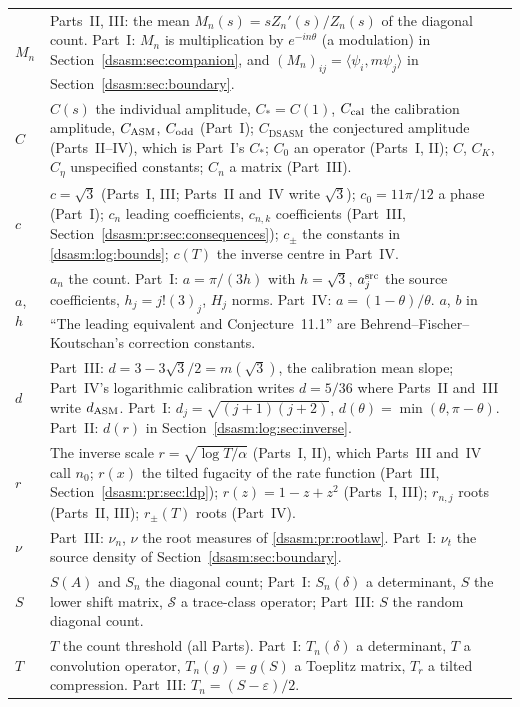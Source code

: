 \documentclass[11pt,letterpaper]{article}
\theoremstyle{remark}\newtheorem{remark}[theorem]{Remark}
\newcommand{\eps}{\varepsilon}\newcommand{\HH}{\mathcal H}\newcommand{\one}{\mathbf1}
\newcommand{\DS}{\mathrm{DSASM}}\newcommand{\ASM}{\mathrm{ASM}}
\begin{document}
\begin{longtable}{@{}>{\raggedright\arraybackslash}p{} >{\raggedright\arraybackslash}p{}@{}}
$M_n$ & Parts~II, III: the mean $M_n(s)=sZ_n'(s)/Z_n(s)$ of the diagonal count. Part~I: $M_n$ is multiplication by $e^{-in\theta}$ (a modulation) in Section~\ref{dsasm:sec:companion}, and $(M_n)_{ij}=\langle\psi_i,m\psi_j\rangle$ in Section~\ref{dsasm:sec:boundary}.\\
$C$ & $C(s)$ the individual amplitude, $C_*=C(1)$, $C_{\rm cal}$ the calibration amplitude, $C_{\rm ASM}$, $C_{\rm odd}$ (Part~I); $C_{\DS}$ the conjectured amplitude (Parts~II--IV), which is Part~I's $C_*$; $C_0$ an operator (Parts~I, II); $C$, $C_K$, $C_\eta$ unspecified constants; $C_n$ a matrix (Part~III).\\
$c$ & $c=\sqrt3$ (Parts~I, III; Parts~II and~IV write $\sqrt3$); $c_0=11\pi/12$ a phase (Part~I); $c_n$ leading coefficients, $c_{n,k}$ coefficients (Part~III, Section~\ref{dsasm:pr:sec:consequences}); $c_\pm$ the constants in \eqref{dsasm:log:bounds}; $c(T)$ the inverse centre in Part~IV.\\
$a$, $h$ & $a_n$ the count. Part~I: $a=\pi/(3h)$ with $h=\sqrt3$, $a_j^{\rm src}$ the source coefficients, $h_j=j!(3)_j$, $H_j$ norms. Part~IV: $a=(1-\theta)/\theta$. $a$, $b$ in ``The leading equivalent and Conjecture~11.1'' are Behrend--Fischer--Koutschan's correction constants.\\
$d$ & Part~III: $d=3-3\sqrt3/2=m(\sqrt3)$, the calibration mean slope; Part~IV's logarithmic calibration writes $d=5/36$ where Parts~II and~III write $d_{\rm ASM}$. Part~I: $d_j=\sqrt{(j+1)(j+2)}$, $d(\theta)=\min(\theta,\pi-\theta)$. Part~II: $d(r)$ in Section~\ref{dsasm:log:sec:inverse}.\\
$r$ & The inverse scale $r=\sqrt{\log T/\alpha}$ (Parts~I, II), which Parts~III and~IV call $n_0$; $r(x)$ the tilted fugacity of the rate function (Part~III, Section~\ref{dsasm:pr:sec:ldp}); $r(z)=1-z+z^2$ (Parts~I, III); $r_{n,j}$ roots (Parts~II, III); $r_\pm(T)$ roots (Part~IV).\\
$\nu$ & Part~III: $\nu_n$, $\nu$ the root measures of \eqref{dsasm:pr:rootlaw}. Part~I: $\nu_t$ the source density of Section~\ref{dsasm:sec:boundary}.\\
$S$ & $S(A)$ and $S_n$ the diagonal count; Part~I: $S_n(\delta)$ a determinant, $S$ the lower shift matrix, $\mathcal S$ a trace-class operator; Part~III: $S$ the random diagonal count.\\
$T$ & $T$ the count threshold (all Parts). Part~I: $T_n(\delta)$ a determinant, $T$ a convolution operator, $T_n(g)=g(S)$ a Toeplitz matrix, $T_r$ a tilted compression. Part~III: $T_n=(S-\eps)/2$.\\

\end{longtable}
\end{document}
